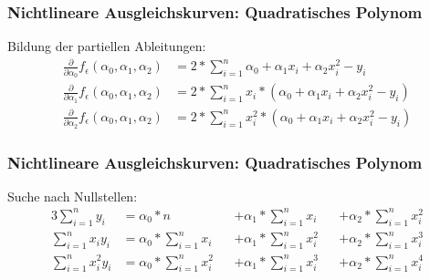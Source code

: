 
\begin{frame}
\frametitle{Nichtlineare Ausgleichskurven: Quadratisches Polynom}

Bildung der partiellen Ableitungen:
\setcounter{equation}{0}
\begin{align}
	\frac{\partial}{\partial \alpha_0} f_{\epsilon}(\alpha_0, \alpha_1, \alpha_2) &= 2 * \sum_{i=1}^{n} \alpha_0 + \alpha_1 x_i + \alpha_2 x_i^2 - y_i \\
	\frac{\partial}{\partial \alpha_1} f_{\epsilon}(\alpha_0, \alpha_1, \alpha_2) &= 2 * \sum_{i=1}^{n} x_i * (\alpha_0 + \alpha_1 x_i + \alpha_2 x_i^2 - y_i) \\
	\frac{\partial}{\partial \alpha_2} f_{\epsilon}(\alpha_0, \alpha_1, \alpha_2) &= 2 * \sum_{i=1}^{n} x_i^2 * (\alpha_0 + \alpha_1 x_i + \alpha_2 x_i^2 - y_i)
\end{align}

\end{frame}


\begin{frame}
\frametitle{Nichtlineare Ausgleichskurven: Quadratisches Polynom}

Suche nach Nullstellen:
\setcounter{equation}{0}
\begin{alignat}{3}
	\sum_{i=1}^{n} y_i &= \alpha_0 * n &&+ \alpha_1 * \sum_{i=1}^{n} x_i &&+ \alpha_2 * \sum_{i=1}^{n} x_i^2 \\
	\sum_{i=1}^{n} x_i y_i &= \alpha_0 * \sum_{i=1}^{n} x_i &&+ \alpha_1 * \sum_{i=1}^{n} x_i^2 &&+ \alpha_2 * \sum_{i=1}^{n} x_i^3 \\
	\sum_{i=1}^{n} x_i^2 y_i &= \alpha_0 * \sum_{i=1}^{n} x_i^2 &&+ \alpha_1 * \sum_{i=1}^{n} x_i^3 &&+ \alpha_2 * \sum_{i=1}^{n} x_i^4
\end{alignat}

\end{frame}


